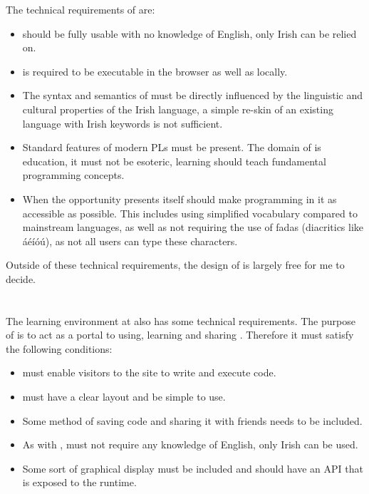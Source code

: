 The technical requirements of \Setanta{} are:
\begin{itemize}
    \item \Setanta{} should be fully usable with no knowledge of English, only Irish can be relied on.
    \item \Setanta{} is required to be executable in the browser as well as locally.
    \item The syntax and semantics of \Setanta{} must be directly influenced by the linguistic and cultural properties of the Irish language, a simple re-skin of an existing language with Irish keywords is not sufficient.
    \item Standard features of modern PLs must be present. The domain of \Setanta{} is education, it must not be esoteric, learning \Setanta{} should teach fundamental programming concepts.
    \item When the opportunity presents itself \Setanta{} should make programming in it as accessible as possible. This includes using simplified vocabulary compared to mainstream languages, as well as not requiring the use of fadas (diacritics like áéíóú), as not all users can type these characters.
\end{itemize}

Outside of these technical requirements, the design of \Setanta{} is largely free for me to decide.

\section{\trys{}}

The learning environment at \trys{} also has some technical requirements. The purpose of \trys{} is to act as a portal to using, learning and sharing \Setanta{}. Therefore it must satisfy the following conditions:
\begin{itemize}
    \item \trys{} must enable visitors to the site to write and execute \Setanta{} code.
    \item \trys{} must have a clear layout and be simple to use.
    \item Some method of saving code and sharing it with friends needs to be included.
    \item As with \Setanta{}, \trys{} must not require any knowledge of English, only Irish can be used.
    \item Some sort of graphical display must be included and should have an API that is exposed to the \Setanta{} runtime.
\end{itemize}
